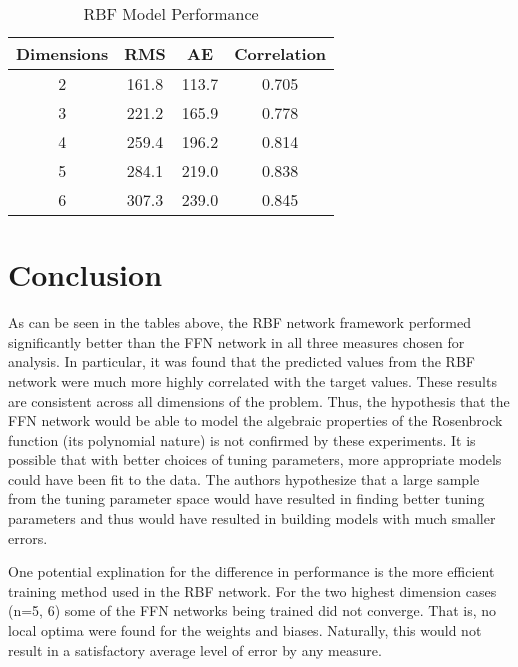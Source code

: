 \documentclass[conference]{IEEEtran}
\begin{document}
    \begin{table}[h]
  \caption{RBF Model Performance}
  \resizebox{1.3\textwidth}{!} {\begin{minipage}{\textwidth}

      
      \begin{tabular}{ c | c | c | c }
        Dimensions & RMS & AE & Correlation \\ \hline
        2 & 161.8 & 113.7 & 0.705 \\
        3 & 221.2 & 165.9 & 0.778 \\
        4 & 259.4 & 196.2 & 0.814 \\
        5 & 284.1 & 219.0 & 0.838 \\
        6 & 307.3 & 239.0 & 0.845
      \end{tabular}

      \label{table:rbfError}
  \end{minipage} }
    \end{table}
    
\section{Conclusion}
As can be seen in the tables above, the RBF network framework performed significantly better than the FFN network in all three measures chosen for analysis. In particular, it was found that the predicted values from the RBF network were much more highly correlated with the target values. These results are consistent across all dimensions of the problem. Thus, the hypothesis that the FFN network would be able to model the algebraic properties of the Rosenbrock function (its polynomial nature) is not confirmed by these experiments. It is possible that with better choices of tuning parameters, more appropriate models could have been fit to the data. The authors hypothesize that a large sample from the tuning parameter space would have resulted in finding better tuning parameters and thus would have resulted in building models with much smaller errors.

One potential explination for the difference in performance is the more efficient training method used in the RBF network. For the two highest dimension cases (n=5, 6) some of the FFN networks being trained did not converge. That is, no local optima were found for the weights and biases. Naturally, this would not result in a satisfactory average level of error by any measure.
\end{document}
